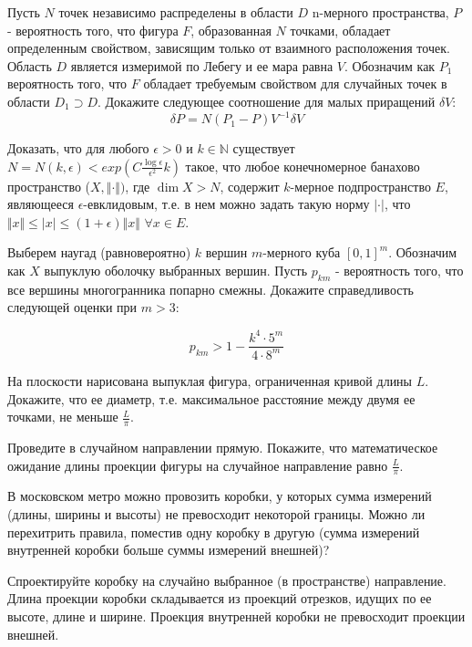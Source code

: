 \begin{problem}
Пусть  $N$ точек независимо распределены в области $D$ n-мерного пространства, $P$ - вероятность того, что фигура $F$, образованная $N$ точками, обладает определенным свойством,
зависящим только от взаимного расположения точек. Область $D$ является измеримой по Лебегу и ее мара равна $V$. Обозначим как $P_1$ вероятность того, что $F$ обладает требуемым свойством для случайных точек в области $D_1 \supset D$. Докажите следующее соотношение для малых приращений $\delta V$:
 \[
 \delta P = N (P_1 - P) V^{-1} \delta V
 \]  

\end{problem}



\begin{problem}
Доказать, что для любого $\epsilon > 0$ и $k \in \mathbb{N}$
существует $N = N(k, \epsilon) < exp(C\frac{\log \epsilon}{\epsilon^2}k)$ такое, что любое конечномерное банахово пространство ($X, \Vert\cdot\Vert)$, где $\dim X > N$, содержит $k$-мерное подпространство $E$, являющееся $\epsilon$-евклидовым, т.е. в нем можно задать такую норму $\vert \cdot \vert$, что $\Vert x \Vert \leqslant \vert x \vert \leqslant (1 + \epsilon) \Vert x \Vert$ $\forall x \in E$.     

\end{problem}

\begin{problem}
Выберем наугад (равновероятно) $k$ вершин $m$-мерного куба $[0,1]^m$. Обозначим как $X$ выпуклую оболочку выбранных вершин. Пусть $p_{km}$ - вероятность того, что все вершины многогранника попарно смежны. Докажите справедливость следующей оценки при $m > 3$:

\[
p_{km} > 1 - \frac{k^4 \cdot 5^m}{4 \cdot 8^m}
\]
    
\end{problem}

\begin{problem}
На плоскости нарисована выпуклая фигура, ограниченная кривой длины $L$. Докажите, что ее диаметр, т.е. максимальное расстояние между двумя ее точками, не меньше $\frac{L}{\pi }$.
\end{problem}
\begin{ordre}
Проведите в случайном направлении прямую. Покажите, что 
математическое ожидание длины проекции фигуры на случайное направление равно 
$\frac{L}{\pi }$.
\end{ordre}

\begin{problem}
В московском метро можно провозить коробки, у которых сумма измерений (длины, ширины и высоты) не превосходит некоторой границы. Можно ли перехитрить правила, поместив одну коробку в другую (сумма измерений внутренней коробки больше суммы измерений внешней)?
\end{problem}
\begin{ordre}
Спроектируйте коробку на случайно выбранное (в пространстве) 
направление. Длина проекции коробки складывается из проекций отрезков, 
идущих по ее высоте, длине и ширине. Проекция внутренней коробки не 
превосходит проекции внешней.
\end{ordre}

